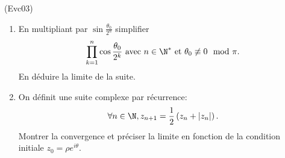\begin{tiny}(Evc03) \end{tiny}
\begin{enumerate}
\item En multipliant par $\sin\frac{\theta_0}{2^n}$ simplifier  
\[
\prod_{k=1}^{n}\cos \frac{\theta_0}{2^{k}} \text{ avec } n\in \N^* \text{ et } \theta_0 \not \equiv 0 \mod \pi.
\]
En déduire la limite de la suite.
\item On définit une suite complexe par récurrence:
\[
 \forall n \in \N, z_{n+1} =\frac{1}{2}\left( z_n + |z_n|\right) .
\]
Montrer la convergence et préciser la limite en fonction de la condition initiale $z_0 = \rho e^{i\theta}$.
\end{enumerate}
 
